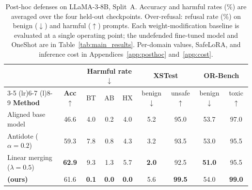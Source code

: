 \begin{table}[t]
\caption{Post-hoc defenses on LLaMA-3-8B, Split~A. Accuracy and harmful rates (\%) are averaged over the four held-out checkpoints. Over-refusal: refusal rate (\%) on benign ($\downarrow$) and harmful ($\uparrow$) prompts. Each weight-modification baseline is evaluated at a single operating point; the undefended fine-tuned model and OneShot are in Table~\ref{tab:main_results}. Per-domain values, SafeLoRA, and inference cost in Appendices~\ref{app:posthoc} and~\ref{app:cost}.}
\label{tab:posthoc}
\centering
\small
\setlength{\tabcolsep}{4.5pt}
\begin{tabular}{@{}lc ccc cc cc@{}}
\toprule
& & \multicolumn{3}{c}{\textbf{Harmful rate} $\downarrow$} & \multicolumn{2}{c}{\textbf{XSTest}} & \multicolumn{2}{c}{\textbf{OR-Bench}} \\
\cmidrule(lr){3-5} \cmidrule(lr){6-7} \cmidrule(l){8-9}
\textbf{Method} & \textbf{Acc} $\uparrow$ & BT & AB & HX & benign$\downarrow$ & unsafe$\uparrow$ & benign$\downarrow$ & toxic$\uparrow$ \\
\midrule
Aligned base model           & 46.6 & 4.0  & 0.2  & 4.0  & 5.2 & 95.0 & 53.7 & 97.0 \\
\midrule
Antidote ($\alpha{=}0.2$)                   & 59.3 & 7.8  & 0.8 & 4.3 & 3.2 & 93.5 & 53.0 & 95.5 \\
Linear merging ($\lambda{=}0.5$)            & \textbf{62.9} & 9.3 & 1.3 & 5.7 & \textbf{2.0} & 92.5 & \textbf{51.0} & 95.5 \\
\midrule
\textbf{\method{} (ours)}                   & 61.6 & \textbf{0.1} & \textbf{0.0} & \textbf{0.0} & 5.6 & \textbf{99.5} & 54.0 & \textbf{99.0} \\
\bottomrule
\end{tabular}
\end{table}
